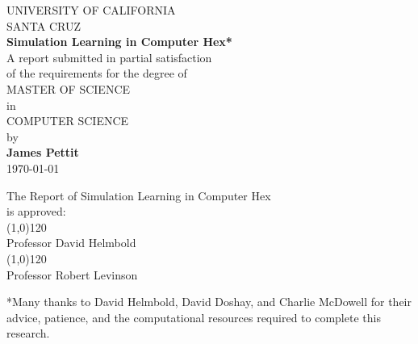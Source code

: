 \documentclass[11pt]{report}
\begin{document}
\begin{titlepage}
\begin{center}
UNIVERSITY OF CALIFORNIA\\[0.4cm]
SANTA CRUZ\\[0.75cm]
\textbf{Simulation Learning in Computer Hex*}\\[0.4cm]
\small{A report submitted in partial satisfaction}\\
\small{of the requirements for the degree of}\\[0.4cm]
MASTER OF SCIENCE\\[0.4cm]
in\\[0.5cm]
COMPUTER SCIENCE\\[0.4cm]
by\\[0.4cm]
\textbf{James Pettit}\\[0.4cm]
\today
\end{center}
\vfill
\begin{flushright}
The Report of Simulation Learning in Computer Hex\\
is approved:\\[1cm]
\line(1,0){120}\\
Professor David Helmbold\\[1cm]
\line(1,0){120}\\
Professor Robert Levinson\\[3cm]
\end{flushright}
\small{*Many thanks to David Helmbold, David Doshay, and Charlie McDowell for their advice, patience, and the computational resources required to complete this research.}
\end{titlepage}

\tableofcontents

\newpage

\def\dsp{\def\baselinestretch{1.5}\large\normalsize}
\dsp

\renewcommand*\thesection{\arabic{section}}
\end{document}
